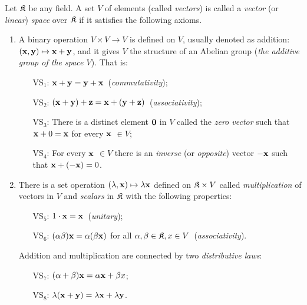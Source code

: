\begin{definition}
	Let ${\mathfrak{K}}$ be any field. A set $V$ of elements (called \textit{vectors}) is called a \textit{vector} (or \textit{linear}) \textit{space} over ${\mathfrak{K}}$ if it satisfies the following axioms.
	\begin{enumerate}[label=\alph*)]
		\item A binary operation $V\times V\to V$ is defined on $V$, usually denoted as addition: $({\mathbf{x}}, {\mathbf{y}}) \mapsto {\mathbf{x}} + {\mathbf{y}}$, and it gives $V$ the structure of an Abelian group (\textit{the additive group of the space $V$}). That is:
		\begin{enumerate}
			\item[VS$_1$:]${\mathbf{x}}+{\mathbf{y}} = {\mathbf{y}}+{\mathbf{x}}$\ (\textit{commutativity});
			\item[VS$_2$:]$({\mathbf{x}}+{\mathbf{y}})+{\mathbf{z}} = {\mathbf{x}}+({\mathbf{y}}+{\mathbf{z}})$\ (\textit{associativity});
			\item[VS$_3$:]There is a distinct element $\v0$ in $V$ called the \textit{zero vector} such that ${\mathbf{x}} + 0 = {\mathbf{x}}$ for every ${\mathbf{x}}$ $\in V$;
			\item[VS$_4$:]For every ${\mathbf{x}}$ $\in V$ there is an \textit{inverse} (or \textit{opposite}) vector $-{\mathbf{x}}$ such that ${\mathbf{x}} + (-{\mathbf{x}}) = 0$.
		\end{enumerate}
		\item There is a set operation $(\lambda, {\mathbf{x}})\mapsto \lambda {\mathbf{x}}$ defined on ${\mathfrak{K}} \times V$ called \textit{multiplication} of vectors in $V$ and \textit{scalars} in ${\mathfrak{K}}$ with the following properties:
		\begin{enumerate}
			\item[VS$_5$:]$1\cdot{\mathbf{x}} = {\mathbf{x}}$\ (\textit{unitary});
			\item[VS$_6$:]$(\alpha \beta){\mathbf{x}} = \alpha (\beta {\mathbf{x}})$ for all $\alpha ,\beta\in{\mathfrak{K}}, x\in V$\ (\textit{associativity}).
		\end{enumerate}
		Addition and multiplication are connected by two \textit{distributive laws}:
		\begin{enumerate}
			\item[VS$_7$:]$(\alpha + \beta){\mathbf{x}} = \alpha {\mathbf{x}} + \beta x$;
			\item[VS$_8$:]$\lambda({\mathbf{x}}+{\mathbf{y}}) = \lambda{\mathbf{x}} + \lambda{\mathbf{y}}$.
		\end{enumerate}
	\end{enumerate}
\end{definition}

